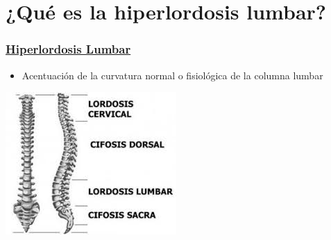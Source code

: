 \documentclass[hyperref={pdfpagelabels=false},xcolor=pst,pdf,fragile]{beamer}
\title{\Title}
\author{\Author\\ \Matricula}
\date{\today}
\begin{document}
\maketitle



\section{¿Qué es la hiperlordosis lumbar?}

\begin{frame}
  \frametitle{
	  \href{http://www.espalda.org/divulgativa/dolor/causas/alteraciones/hiperlordosis.asp}
	  {Hiperlordosis Lumbar}
  }
  
  \pause
  \begin{itemize}
	\item Acentuación de la curvatura normal o fisiológica de la columna lumbar
  \end{itemize}
  
  \begin{center}
	  \includegraphics[scale=0.4]{img/columna_vertebral.jpeg}
  \end{center}

\end{frame}
\end{document}

